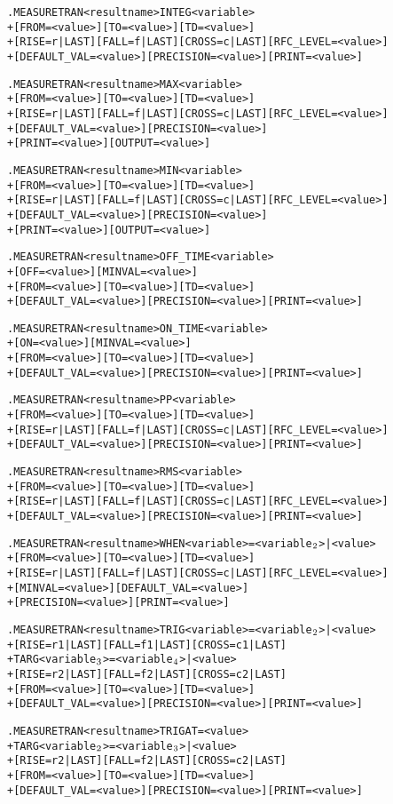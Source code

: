 \begin{Command}
\begin{alltt}
.MEASURE TRAN <result name> INTEG <variable>
+ [FROM=<value>] [TO=<value>] [TD=<value>]
+ [RISE=r|LAST] [FALL=f|LAST] [CROSS=c|LAST] [RFC_LEVEL=<value>]
+ [DEFAULT_VAL=<value>] [PRECISION=<value>] [PRINT=<value>]

.MEASURE TRAN <result name> MAX <variable>
+ [FROM=<value>] [TO=<value>] [TD=<value>]
+ [RISE=r|LAST] [FALL=f|LAST] [CROSS=c|LAST] [RFC_LEVEL=<value>]
+ [DEFAULT_VAL=<value>] [PRECISION=<value>] 
+ [PRINT=<value>] [OUTPUT=<value>]

.MEASURE TRAN <result name> MIN <variable>
+ [FROM=<value>] [TO=<value>] [TD=<value>]
+ [RISE=r|LAST] [FALL=f|LAST] [CROSS=c|LAST] [RFC_LEVEL=<value>]
+ [DEFAULT_VAL=<value>] [PRECISION=<value>] 
+ [PRINT=<value>] [OUTPUT=<value>]

.MEASURE TRAN <result name> OFF_TIME <variable>
+ [OFF=<value>] [MINVAL=<value>]
+ [FROM=<value>] [TO=<value>] [TD=<value>]
+ [DEFAULT_VAL=<value>] [PRECISION=<value>] [PRINT=<value>]

.MEASURE TRAN <result name> ON_TIME <variable>
+ [ON=<value>] [MINVAL=<value>]
+ [FROM=<value>] [TO=<value>] [TD=<value>]
+ [DEFAULT_VAL=<value>] [PRECISION=<value>] [PRINT=<value>]

.MEASURE TRAN <result name> PP <variable>
+ [FROM=<value>] [TO=<value>] [TD=<value>]
+ [RISE=r|LAST] [FALL=f|LAST] [CROSS=c|LAST] [RFC_LEVEL=<value>]
+ [DEFAULT_VAL=<value>] [PRECISION=<value>] [PRINT=<value>]

.MEASURE TRAN <result name> RMS <variable>
+ [FROM=<value>] [TO=<value>] [TD=<value>]
+ [RISE=r|LAST] [FALL=f|LAST] [CROSS=c|LAST] [RFC_LEVEL=<value>]
+ [DEFAULT_VAL=<value>] [PRECISION=<value>] [PRINT=<value>]

.MEASURE TRAN <result name> WHEN <variable>=<variable\(\sb{2}\)>|<value>
+ [FROM=<value>] [TO=<value>] [TD=<value>] 
+ [RISE=r|LAST] [FALL=f|LAST] [CROSS=c|LAST] [RFC_LEVEL=<value>]
+ [MINVAL=<value>] [DEFAULT_VAL=<value>] 
+ [PRECISION=<value>] [PRINT=<value>]

.MEASURE TRAN <result name> TRIG <variable>=<variable\(\sb{2}\)>|<value>
+ [RISE=r1|LAST] [FALL=f1|LAST] [CROSS=c1|LAST]
+ TARG <variable\(\sb{3}\)>=<variable\(\sb{4}\)>|<value> 
+ [RISE=r2|LAST] [FALL=f2|LAST] [CROSS=c2|LAST]
+ [FROM=<value>] [TO=<value>] [TD=<value>] 
+ [DEFAULT_VAL=<value>] [PRECISION=<value>] [PRINT=<value>]

.MEASURE TRAN <result name> TRIG AT=<value>
+ TARG <variable\(\sb{2}\)>=<variable\(\sb{3}\)>|<value> 
+ [RISE=r2|LAST] [FALL=f2|LAST] [CROSS=c2|LAST]
+ [FROM=<value>] [TO=<value>] [TD=<value>] 
+ [DEFAULT_VAL=<value>] [PRECISION=<value>] [PRINT=<value>]


\end{alltt}
\end{Command}
